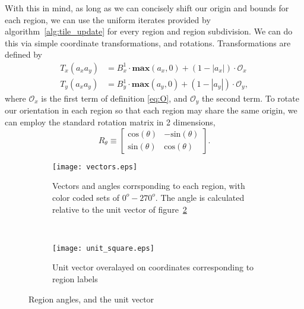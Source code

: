 With this in mind, as long as we can concisely shift our origin and bounds for each region, we can use the
uniform iterates provided by algorithm~\ref{alg:tile_update} for every region and region subdivision.
We can do this via simple coordinate transformations,
and rotations.  Transformations are defined by
\begin{eqnarray}
  T_x(a_xa_y) &= B_x^1 \cdot \mathbf{max}(a_x,0) + (1 - |a_x|) \cdot \mathcal{O}_x\\
  T_y(a_xa_y) &= B_y^1 \cdot \mathbf{max}(a_y,0) + (1 - |a_y|) \cdot \mathcal{O}_y,
  \label{eq:transforms}
\end{eqnarray}
where $\mathcal{O}_x$ is the first term of definition \ref{eq:O}, and $\mathcal{O}_y$ the second term.  To
rotate our orientation in each region so that each region may share the same origin, we can employ the
standard rotation matrix in 2 dimensions,
\begin{equation}
  R_{\theta} \equiv \begin{bmatrix}
    \text{cos} (\theta) & - \text{sin}(\theta) \\
    \text{sin}(\theta) & \text{cos}(\theta)
    \end{bmatrix}.
\end{equation}

\begin{figure}[h]
  \centering
  \begin{subfigure}[h]{.5\textwidth}
    \centering
    \texttt{[image: vectors.eps]}
    \caption{Vectors and angles corrsponding to each
    region, with color coded sets of $0^o - 270^o$.  The
    angle is calculated relative to the unit vector of
    figure~\ref{subfig:unit}}
    \label{subfig:all_vectors}
  \end{subfigure}
  ~
  \begin{subfigure}[h]{.4\textwidth}
    \centering
    \texttt{[image: unit\_square.eps]}
    \caption{Unit vector overalayed on coordinates
    corresponding to region labels}
    \label{subfig:unit}
    \end{subfigure}
  \caption{Region angles, and the unit vector}
  \label{fig:vectors}
\end{figure}

